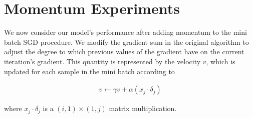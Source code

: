 \section{Momentum Experiments}


We now consider our model's performance after adding momentum to the mini batch SGD
procedure. We modify the gradient sum in the original algorithm to adjust the degree
to which previous values of the gradient have on the current iteration's gradient.
This quantity is represented by the velocity $v$, which is updated for each sample in
the mini batch according to

\begin{align*}
	v \gets \gamma v + \alpha (x_j \cdot \delta _j)
\end{align*}

where $x_j \cdot \delta_j$ is a $(i, 1) \times (1, j)$ matrix multiplication.
